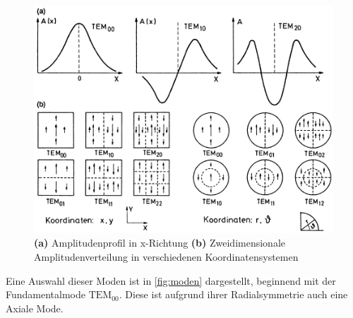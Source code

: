 \begin{figure}[H]
    \centering
    \includegraphics[scale=0.5]{Ressourcen/moden.png}
    \caption{\textbf{(a)} Amplitudenprofil in x-Richtung \textbf{(b)} Zweidimensionale Amplitudenverteilung in verschiedenen Koordinatensystemen\cite{Demtroeder}}\label{fig:moden}
\end{figure}
Eine Auswahl dieser Moden ist in \autoref{fig:moden} dargestellt, beginnend mit der Fundamentalmode $\mathrm{TEM_{00}}$. Diese ist aufgrund ihrer Radialsymmetrie auch eine Axiale Mode.
